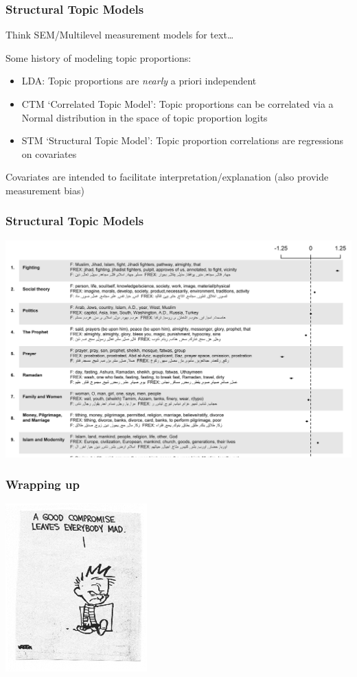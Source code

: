 \documentclass[11pt,compress,professionalfonts]{beamer}
\newcommand{\ita}{\begin{itemize}}
\newcommand{\itm}{\item[]}
\newcommand{\itz}{\end{itemize}}
\begin{document}
\begin{frame}[t]\frametitle{Structural Topic Models}

Think SEM/Multilevel measurement models for text\ldots

Some history of modeling topic proportions:
\ita
\itm LDA: Topic proportions are \textit{nearly} a priori independent
\itm CTM `Correlated Topic Model': Topic proportions can be correlated via a Normal distribution in the space of topic proportion logits
\itm STM `Structural Topic Model': Topic proportion correlations are regressions on covariates
\itz

Covariates are intended to facilitate interpretation/explanation (also provide measurement bias)

\end{frame}
\begin{frame}[t]\frametitle{Structural Topic Models}

\centerline{\includegraphics[scale=.8]{pictures/stm-clerics}}

\end{frame}
\begin{frame}[t]\frametitle{Wrapping up}

\centerline{\includegraphics[scale=1.5]{pictures/compromise.png}}

\slide{}

\end{frame}
\end{document}
